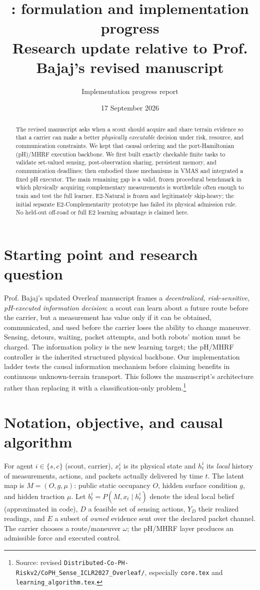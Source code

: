\documentclass[10pt]{article}
\title{\vspace{-1.5em}\method: formulation and implementation progress\\
\large Research update relative to Prof. Bajaj's revised manuscript}
\author{Implementation progress report}
\date{17 September 2026}
\begin{document}
\maketitle
\vspace{-1.5em}
\begin{abstract}
The revised manuscript asks when a scout should acquire and share terrain
evidence so that a carrier can make a better \emph{physically executable}
decision under risk, resource, and communication constraints. We kept that
causal ordering and the port-Hamiltonian (pH)/MHRF execution backbone. We
first built exactly checkable finite tasks to validate set-valued sensing,
post-observation sharing, persistent memory, and communication deadlines;
then embodied those mechanisms in VMAS and integrated a fixed pH executor.
The main remaining gap is a valid, frozen procedural benchmark in which
physically acquiring complementary measurements is worthwhile often enough
to train and test the full learner. E2-Natural is frozen and legitimately
skip-heavy; the initial separate E2-Complementarity prototype has failed its
physical admission rule. No held-out off-road or full E2 learning advantage is
claimed here.
\end{abstract}

\section{Starting point and research question}
Prof. Bajaj's updated Overleaf manuscript frames a \emph{decentralized,
risk-sensitive, pH-executed information decision}: a scout can learn about a
future route before the carrier, but a measurement has value only if it can be
obtained, communicated, and used before the carrier loses the ability to
change maneuver. Sensing, detours, waiting, packet attempts, and both robots'
motion must be charged. The information policy is the new learning target;
the pH/MHRF controller is the inherited structured physical backbone. Our
implementation ladder tests the causal information mechanism before
claiming benefits in continuous unknown-terrain transport. This follows the
manuscript's architecture rather than replacing it with a classification-only
problem.\footnote{Source: revised
\texttt{Distributed-Co-PH-Riskv2/CoPH\_Sense\_ICLR2027\_Overleaf/}, especially
\texttt{core.tex} and \texttt{learning\_algorithm.tex}.}

\section{Notation, objective, and causal algorithm}
For agent $i\in\{s,c\}$ (scout, carrier), $x^i_t$ is its physical state and
$h^i_t$ its \emph{local} history of measurements, actions, and packets actually
delivered by time $t$. The latent map is
$M=(O,g,\mu)$: public static occupancy $O$, hidden surface condition $g$, and
hidden traction $\mu$. Let $b^i_t=P(M,x_t\mid h^i_t)$ denote the ideal local
belief (approximated in code), $D$ a feasible set of sensing actions, $Y_D$
their realized readings, and $E$ a subset of \emph{owned} evidence sent over
the declared packet channel. The carrier chooses a route/maneuver $\omega$;
the pH/MHRF layer produces an admissible force and executed control.
\end{document}

